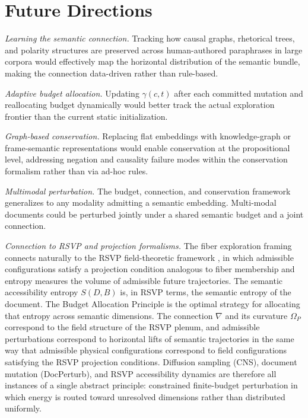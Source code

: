 \documentclass[12pt, a4paper]{article}
\theoremstyle{plain}
\theoremstyle{definition}
\theoremstyle{remark}
\newcommand{\connD}{\nabla}
\newcommand{\curv}{\Omega}
\begin{document}
\section{Future Directions}
\label{sec:future}

\emph{Learning the semantic connection.}  Tracking how causal graphs, rhetorical
trees, and polarity structures are preserved across human-authored paraphrases
in large corpora would effectively map the horizontal distribution of the semantic
bundle, making the connection data-driven rather than rule-based.

\emph{Adaptive budget allocation.}  Updating $\gamma(c,t)$ after each committed
mutation and reallocating budget dynamically would better track the actual
exploration frontier than the current static initialization.

\emph{Graph-based conservation.}  Replacing flat embeddings with knowledge-graph
or frame-semantic representations would enable conservation at the propositional
level, addressing negation and causality failure modes within the conservation
formalism rather than via ad-hoc rules.

\emph{Multimodal perturbation.}  The budget, connection, and conservation
framework generalizes to any modality admitting a semantic embedding.
Multi-modal documents could be perturbed jointly under a shared semantic budget
and a joint connection.

\emph{Connection to RSVP and projection formalisms.}  The fiber exploration
framing connects naturally to the RSVP field-theoretic framework
\cite{flyxion2025rsvp}, in which admissible configurations satisfy a projection
condition analogous to fiber membership and entropy measures the volume of
admissible future trajectories.  The semantic accessibility entropy $S(D,B)$
is, in RSVP terms, the semantic entropy of the document.  The Budget Allocation
Principle is the optimal strategy for allocating that entropy across semantic
dimensions.  The connection $\connD$ and its curvature $\curv_P$ correspond to
the field structure of the RSVP plenum, and admissible perturbations correspond
to horizontal lifts of semantic trajectories in the same way that admissible
physical configurations correspond to field configurations satisfying the RSVP
projection conditions.  Diffusion sampling (CNS), document mutation (DocPerturb),
and RSVP accessibility dynamics are therefore all instances of a single abstract
principle: constrained finite-budget perturbation in which energy is routed
toward unresolved dimensions rather than distributed uniformly.
\end{document}
